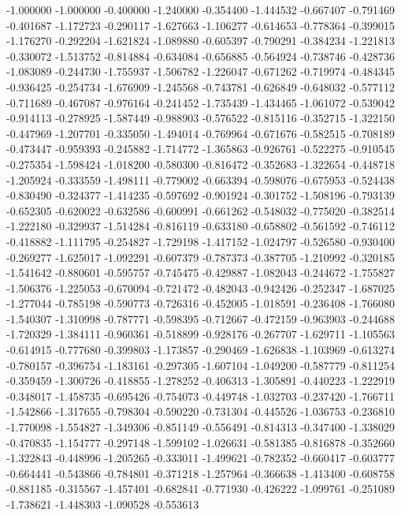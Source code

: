 -1.000000
-1.000000
-0.400000
-1.240000
-0.354400
-1.444532
-0.667407
-0.791469
-0.401687
-1.172723
-0.290117
-1.627663
-1.106277
-0.614653
-0.778364
-0.399015
-1.176270
-0.292204
-1.621824
-1.089880
-0.605397
-0.790291
-0.384234
-1.221813
-0.330072
-1.513752
-0.814884
-0.634084
-0.656885
-0.564924
-0.738746
-0.428736
-1.083089
-0.244730
-1.755937
-1.506782
-1.226047
-0.671262
-0.719974
-0.484345
-0.936425
-0.254734
-1.676909
-1.245568
-0.743781
-0.626849
-0.648032
-0.577112
-0.711689
-0.467087
-0.976164
-0.241452
-1.735439
-1.434465
-1.061072
-0.539042
-0.914113
-0.278925
-1.587449
-0.988903
-0.576522
-0.815116
-0.352715
-1.322150
-0.447969
-1.207701
-0.335050
-1.494014
-0.769964
-0.671676
-0.582515
-0.708189
-0.473447
-0.959393
-0.245882
-1.714772
-1.365863
-0.926761
-0.522275
-0.910545
-0.275354
-1.598424
-1.018200
-0.580300
-0.816472
-0.352683
-1.322654
-0.448718
-1.205924
-0.333559
-1.498111
-0.779002
-0.663394
-0.598076
-0.675953
-0.524438
-0.830490
-0.324377
-1.414235
-0.597692
-0.901924
-0.301752
-1.508196
-0.793139
-0.652305
-0.620022
-0.632586
-0.600991
-0.661262
-0.548032
-0.775020
-0.382514
-1.222180
-0.329937
-1.514284
-0.816119
-0.633180
-0.658802
-0.561592
-0.746112
-0.418882
-1.111795
-0.254827
-1.729198
-1.417152
-1.024797
-0.526580
-0.930400
-0.269277
-1.625017
-1.092291
-0.607379
-0.787373
-0.387705
-1.210992
-0.320185
-1.541642
-0.880601
-0.595757
-0.745475
-0.429887
-1.082043
-0.244672
-1.755827
-1.506376
-1.225053
-0.670094
-0.721472
-0.482043
-0.942426
-0.252347
-1.687025
-1.277044
-0.785198
-0.590773
-0.726316
-0.452005
-1.018591
-0.236408
-1.766080
-1.540307
-1.310998
-0.787771
-0.598395
-0.712667
-0.472159
-0.963903
-0.244688
-1.720329
-1.384111
-0.960361
-0.518899
-0.928176
-0.267707
-1.629711
-1.105563
-0.614915
-0.777680
-0.399803
-1.173857
-0.290469
-1.626838
-1.103969
-0.613274
-0.780157
-0.396754
-1.183161
-0.297305
-1.607104
-1.049200
-0.587779
-0.811254
-0.359459
-1.300726
-0.418855
-1.278252
-0.406313
-1.305891
-0.440223
-1.222919
-0.348017
-1.458735
-0.695426
-0.754073
-0.449748
-1.032703
-0.237420
-1.766711
-1.542866
-1.317655
-0.798304
-0.590220
-0.731304
-0.445526
-1.036753
-0.236810
-1.770098
-1.554827
-1.349306
-0.851149
-0.556491
-0.814313
-0.347400
-1.338029
-0.470835
-1.154777
-0.297148
-1.599102
-1.026631
-0.581385
-0.816878
-0.352660
-1.322843
-0.448996
-1.205265
-0.333011
-1.499621
-0.782352
-0.660417
-0.603777
-0.664441
-0.543866
-0.784801
-0.371218
-1.257964
-0.366638
-1.413400
-0.608758
-0.881185
-0.315567
-1.457401
-0.682841
-0.771930
-0.426222
-1.099761
-0.251089
-1.738621
-1.448303
-1.090528
-0.553613
